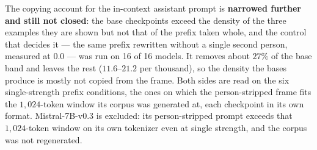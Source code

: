 The copying account for the in-context assistant prompt is \textbf{narrowed further and still not closed}: the base checkpoints exceed the density of the three examples they are shown but not that of the prefix taken whole, and the control that decides it --- the same prefix rewritten without a single second person, measured at $0.0$ --- was run on 16 of 16 models. It removes about $27\%$ of the base band and leaves the rest ($11.6$--$21.2$ per thousand), so the density the bases produce is mostly not copied from the frame. Both sides are read on the six single-strength prefix conditions, the ones on which the person-stripped frame fits the $1{,}024$-token window its corpus was generated at, each checkpoint in its own format. Mistral-7B-v0.3 is excluded: its person-stripped prompt exceeds that $1{,}024$-token window on its own tokenizer even at single strength, and the corpus was not regenerated.
